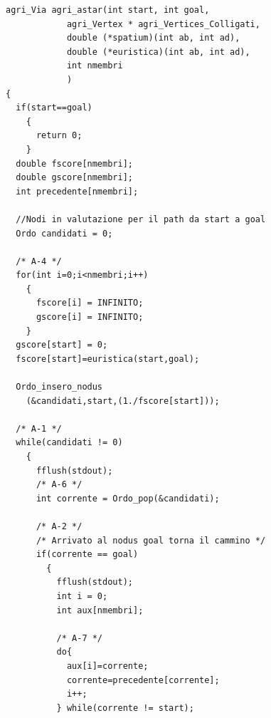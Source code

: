 \documentclass[8pt]{book}
\begin{document}
\begin{spacing}{0.85}
  \begin{small}
\begin{tcolorbox}
\begin{verbatim}
agri_Via agri_astar(int start, int goal,
		    agri_Vertex * agri_Vertices_Colligati,
		    double (*spatium)(int ab, int ad),
		    double (*euristica)(int ab, int ad),
		    int nmembri
		    )
{
  if(start==goal)
    {
      return 0;
    }
  double fscore[nmembri];
  double gscore[nmembri];
  int precedente[nmembri];
  
  //Nodi in valutazione per il path da start a goal
  Ordo candidati = 0;
  
  /* A-4 */
  for(int i=0;i<nmembri;i++)
    {
      fscore[i] = INFINITO;
      gscore[i] = INFINITO;
    }
  gscore[start] = 0;
  fscore[start]=euristica(start,goal);
  
  Ordo_insero_nodus
    (&candidati,start,(1./fscore[start]));
  
  /* A-1 */
  while(candidati != 0)
    {
      fflush(stdout);
      /* A-6 */
      int corrente = Ordo_pop(&candidati);
      
      /* A-2 */
      /* Arrivato al nodus goal torna il cammino */
      if(corrente == goal)
        {
          fflush(stdout);
          int i = 0;
          int aux[nmembri];

          /* A-7 */
          do{
            aux[i]=corrente;
            corrente=precedente[corrente];
            i++;
          } while(corrente != start);
\end{verbatim}
    \end{tcolorbox}
  \end{small}
\end{spacing}
\end{document}
